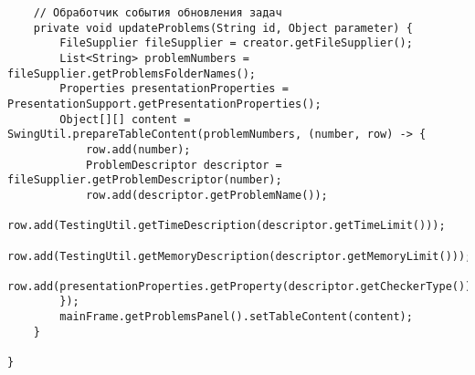 \begin{verbatim}
    // Обработчик события обновления задач
    private void updateProblems(String id, Object parameter) {
        FileSupplier fileSupplier = creator.getFileSupplier();
        List<String> problemNumbers = fileSupplier.getProblemsFolderNames();
        Properties presentationProperties = PresentationSupport.getPresentationProperties();
        Object[][] content = SwingUtil.prepareTableContent(problemNumbers, (number, row) -> {
            row.add(number);
            ProblemDescriptor descriptor = fileSupplier.getProblemDescriptor(number);
            row.add(descriptor.getProblemName());
            row.add(TestingUtil.getTimeDescription(descriptor.getTimeLimit()));
            row.add(TestingUtil.getMemoryDescription(descriptor.getMemoryLimit()));
            row.add(presentationProperties.getProperty(descriptor.getCheckerType()));
        });
        mainFrame.getProblemsPanel().setTableContent(content);
    }

}
\end{verbatim}

